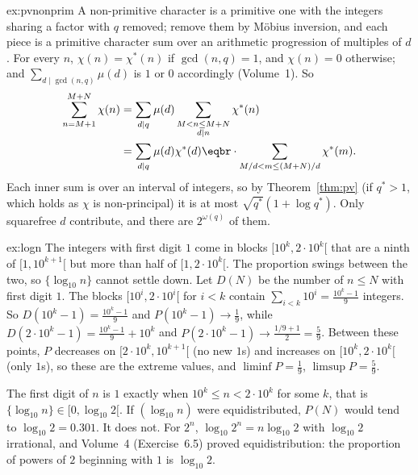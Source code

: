 \begin{solution}{ex:pvnonprim}
\idea A non-primitive character is a primitive one with the integers sharing a factor with $q$ removed; remove them by Möbius inversion, and each piece is a primitive character sum over an arithmetic progression of multiples of $d$.
\writeup For every $n$, $\chi(n)=\chi^*(n)$ if $\gcd(n,q)=1$, and $\chi(n)=0$ otherwise; and $\sum_{d\mid\gcd(n,q)}\mu(d)$ is $1$ or $0$ accordingly (Volume~1). So
\[
\begin{aligned}\sum_{n=M+1}^{M+N}\chi(n)&=\sum_{d\mid q}\mu(d)\sum_{\substack{M<n\le M+N\\d\mid n}}\chi^*(n)\\&=\sum_{d\mid q}\mu(d)\chi^*(d)\eqbr\cdot\sum_{M/d<m\le(M+N)/d}\chi^*(m).\end{aligned}
\]
Each inner sum is over an interval of integers, so by Theorem~\ref{thm:pv} (if $q^*>1$, which holds as $\chi$ is non-principal) it is at most $\sqrt{q^*}(1+\log q^*)$. Only squarefree $d$ contribute, and there are $2^{\omega(q)}$ of them.
\end{solution}

\begin{solution}{ex:logn}
\idea The integers with first digit $1$ come in blocks $[10^k,2\cdot10^k[$ that are a ninth of $[1,10^{k+1}[$ but more than half of $[1,2\cdot10^k[$. The proportion swings between the two, so $\{\log_{10}n\}$ cannot settle down.
\writeup Let $D(N)$ be the number of $n\le N$ with first digit $1$. The blocks $[10^i,2\cdot10^i[$ for $i<k$ contain $\sum_{i<k}10^i=\frac{10^k-1}9$ integers. So $D(10^k-1)=\frac{10^k-1}9$ and $P(10^k-1)\to\frac19$, while
$D(2\cdot10^k-1)=\frac{10^k-1}9+10^k$ and $P(2\cdot10^k-1)\to\frac{1/9+1}2=\frac59$. Between these points, $P$ decreases on $[2\cdot10^k,10^{k+1}[$ (no new $1$s) and increases on $[10^k,2\cdot10^k[$ (only $1$s), so these
are the extreme values, and $\liminf P=\frac19$, $\limsup P=\frac59$.

The first digit of $n$ is $1$ exactly when $10^k\le n<2\cdot10^k$ for some $k$, that is $\{\log_{10}n\}\in[0,\log_{10}2[$. If $(\log_{10}n)$ were equidistributed, $P(N)$ would tend to $\log_{10}2=0.301$. It does not. For $2^n$,
$\log_{10}2^n=n\log_{10}2$ with $\log_{10}2$ irrational, and Volume~4 (Exercise~6.5) proved equidistribution: the proportion of powers of $2$ beginning with $1$ is $\log_{10}2$.
\end{solution}

